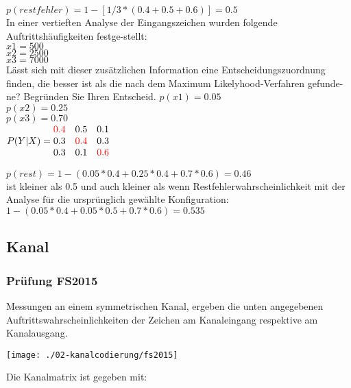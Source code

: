 $p(restfehler) = 1 - [1/3*(0.4+0.5+0.6)] = 0.5$\\

In einer vertieften Analyse der Eingangszeichen wurden folgende Auftrittshäufigkeiten festge-stellt:\\
$x1 = 500$\\
$x2 = 2500$\\
$x3 = 7000$\\

Lässt sich mit dieser zusätzlichen Information eine Entscheidungszuordnung finden, die besser ist als die nach dem Maximum Likelyhood-Verfahren gefunde-ne? Begründen Sie Ihren Entscheid.
$p(x1) = 0.05$\\
$p(x2) = 0.25$\\
$p(x3) = 0.70$\\


$P(Y|X) = \begin{matrix}
    \textcolor{red}{0.4} & 0.5 & 0.1\\
    0.3 & \textcolor{red}{0.4} & 0.3\\
    0.3 & 0.1 & \textcolor{red}{0.6}
\end{matrix}$

$p(rest) = 1-(0.05*0.4 + 0.25*0.4 + 0.7*0.6) = 0.46 $\\

ist kleiner als 0.5 und auch kleiner als wenn Restfehlerwahrscheinlichkeit mit der Analyse für 	die ursprünglich gewählte Konfiguration:\\
$1 - (0.05*0.4 + 0.05*0.5 + 0.7*0.6) = 0.535$

\subsection{Kanal}
\subsubsection{Prüfung FS2015}
Messungen an einem symmetrischen Kanal, ergeben die unten angegebenen Auftrittswahrscheinlichkeiten der Zeichen am Kanaleingang respektive am Kanalausgang.\\
\begin{center}
    \vspace{-8pt}
    \texttt{[image: ./02-kanalcodierung/fs2015]}
    \vspace{-8pt}
\end{center}

Die Kanalmatrix ist gegeben mit:

